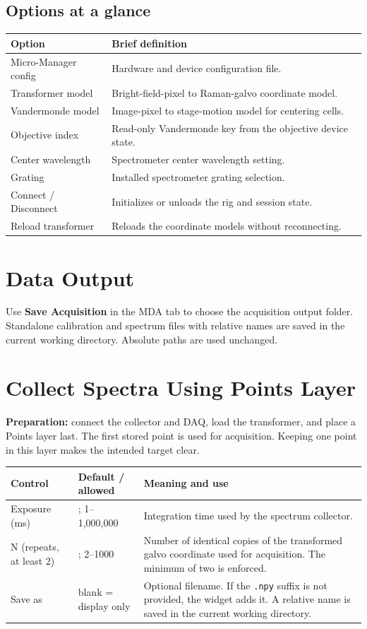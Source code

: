 \documentclass[11pt,oneside]{report}
\makeatletter
\newcommand{\ui}[1]{\textbf{#1}}
\newcommand{\code}[1]{\texttt{#1}}
\newcommand{\fieldtable}{\begin{longtable}{@{}>{\raggedright\arraybackslash}p{0.25\textwidth}>{\raggedright\arraybackslash}p{0.18\textwidth}>{\raggedright\arraybackslash}p{0.50\textwidth}@{}}\toprule\textbf{Control} & \textbf{Default / allowed} & \textbf{Meaning and use}\\\midrule\endhead}
\newcommand{\endfieldtable}{\bottomrule\end{longtable}}
\makeatother
\begin{document}
\section*{Options at a glance}
\begin{longtable}{@{}p{}p{}@{}}
\toprule\textbf{Option} & \textbf{Brief definition}\\\midrule
Micro-Manager config & Hardware and device configuration file.\\
Transformer model & Bright-field-pixel to Raman-galvo coordinate model.\\
Vandermonde model & Image-pixel to stage-motion model for centering cells.\\
Objective index & Read-only Vandermonde key from the objective device state.\\
Center wavelength & Spectrometer center wavelength setting.\\
Grating & Installed spectrometer grating selection.\\
Connect / Disconnect & Initializes or unloads the rig and session state.\\
Reload transformer & Reloads the coordinate models without reconnecting.\\
\bottomrule\end{longtable}

\chapter{Data Output}
Use \ui{Save Acquisition} in the MDA tab to choose the acquisition output folder.
Standalone calibration and spectrum files with relative names are saved in the
current working directory. Absolute paths are used unchanged.

\chapter{Collect Spectra Using Points Layer}

\textbf{Preparation:} connect the collector and DAQ, load the transformer, and
place a Points layer last. The first stored point is used for acquisition. Keeping
one point in this layer makes the intended target clear.

\fieldtable
Exposure (ms) & 1000; 1--1,000,000 & Integration time used by the spectrum collector.\\
N (repeats, at least 2) & 2; 2--1000 & Number of identical copies of the transformed
galvo coordinate used for acquisition. The minimum of two is enforced.\\
Save as & blank = display only & Optional filename. If the \code{.npy} suffix is
not provided, the widget adds it. A relative name is saved in the current working directory.\\
\endfieldtable
\end{document}
